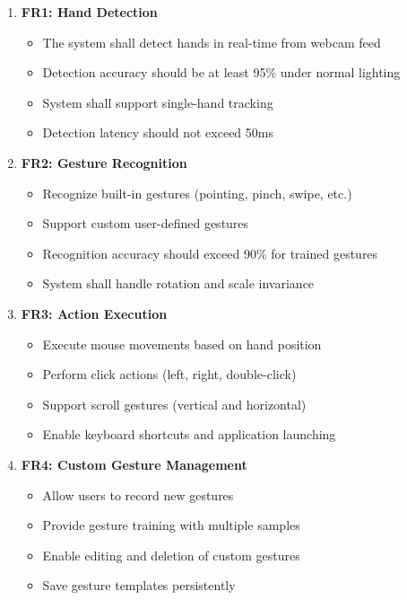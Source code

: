 \documentclass[12pt,a4paper]{report}
\begin{document}
\begin{enumerate}
    \item \textbf{FR1: Hand Detection}
    \begin{itemize}
        \item The system shall detect hands in real-time from webcam feed
        \item Detection accuracy should be at least 95\% under normal lighting
        \item System shall support single-hand tracking
        \item Detection latency should not exceed 50ms
    \end{itemize}
    
    \item \textbf{FR2: Gesture Recognition}
    \begin{itemize}
        \item Recognize built-in gestures (pointing, pinch, swipe, etc.)
        \item Support custom user-defined gestures
        \item Recognition accuracy should exceed 90\% for trained gestures
        \item System shall handle rotation and scale invariance
    \end{itemize}
    
    \item \textbf{FR3: Action Execution}
    \begin{itemize}
        \item Execute mouse movements based on hand position
        \item Perform click actions (left, right, double-click)
        \item Support scroll gestures (vertical and horizontal)
        \item Enable keyboard shortcuts and application launching
    \end{itemize}
    
    \item \textbf{FR4: Custom Gesture Management}
    \begin{itemize}
        \item Allow users to record new gestures
        \item Provide gesture training with multiple samples
        \item Enable editing and deletion of custom gestures
        \item Save gesture templates persistently
    \end{itemize}
    

\end{enumerate}
\end{document}

